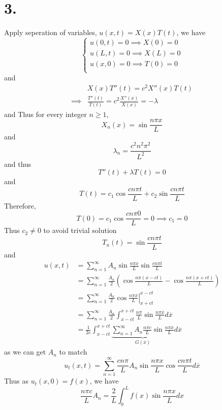 \documentclass[11pt]{article}
\theoremstyle{mystyle}
\theoremstyle{definition}
\begin{document}
\section*{3.}
Apply seperation of variables, $u(x,t) = X(x) T(t)$, we have  \\
\[
  \begin{cases}
    u(0,t) = 0 \implies X(0) = 0 \\
    u(L,t) = 0 \implies X(L) = 0 \\
    u(x,0) = 0 \implies T(0) = 0 \\
  \end{cases}
\]
and 
\begin{align*}
  &X(x) T''(t) = c^2 X''(x)T(t) \\
  \implies & \displaystyle\frac{T''(t)}{T(t)} = c^2 \displaystyle\frac{X''(x)}{X(x)} = -\lambda
\end{align*}
and
Thus for every integer $n\ge 1$,  
\[
  X_n(x) = \sin \displaystyle\frac{n\pi x}{L}
\]
and 
\[
  \lambda_n =  \displaystyle\frac{c^2 n^2\pi^2}{L^2}
\]
and thus 
\[
  T''(t) + \lambda T(t) = 0 
\]
and 
\[
  T(t) = c_1 \cos \displaystyle\frac{cn\pi t}{L} + c_2 \sin \displaystyle\frac{cn \pi t}{L}
\]
Therefore, 
\[
  T(0) = c_1 \cos \displaystyle\frac{cn\pi 0}{L} = 0 \implies c_1 = 0
\]
Thus $c_2 \ne 0$ to avoid trivial solution
\[
  T_n(t) = \sin \displaystyle\frac{cn\pi t}{L} 
\]
and 
\begin{align*}
  u(x,t) &= \sum_{n=1}^\infty A_n \sin \displaystyle\frac{n\pi x}{L} \sin \displaystyle\frac{cn\pi t}{L} \\
  &= \sum_{n=1}^\infty \displaystyle\frac{A_n}{2} \left( \cos \displaystyle\frac{n\pi(x-ct)}{L} - \cos \displaystyle\frac{n\pi (x+ct)}{L} \right) \\ 
  &= \sum_{n=1}^\infty \displaystyle\frac{A_n}{2} \left. \cos \displaystyle\frac{n\pi \overline{x}}{L} \right|_{x+ct}^{x-ct} \\
  &= \sum_{n=1}^\infty \displaystyle\frac{A_n}{2} \int_{x-ct}^{x+ct} \displaystyle\frac{n\pi}{L}\sin \displaystyle\frac{n\pi \overline{x}}{L} d \overline{x} \\
  &= \displaystyle\frac{1}{2c} \int_{x-ct}^{x+ct} \underbrace{\sum_{n=1}^\infty A_n \displaystyle\frac{n\pi c}{L} \sin \displaystyle\frac{n\pi \overline{x}}{L}}_{G(\overline{x})} d\overline{x}
\end{align*}
as we can get $A_n$ to match 
\[
  u_t(x,t) = \sum_{n=1}^\infty \displaystyle\frac{cn\pi}{L} A_n \sin \displaystyle\frac{n\pi x}{L} \cos \displaystyle\frac{cn\pi t}{L} d\overline{x}
\]
Thus as $u_t(x,0) = f(x)$, we have  
\[
  \displaystyle\frac{n \pi c}{L}A_n = \displaystyle\frac{2}{L} \int_0^L f(x) \sin \displaystyle\frac{n\pi x}{L} dx 
\]
\newpage
\end{document}
